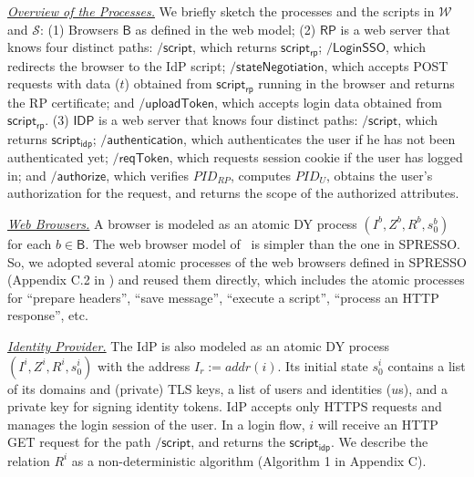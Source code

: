 \vspace{1mm}\noindent \underline{\em Overview of the Processes.} We briefly sketch the processes and the scripts in $\mathcal{W}$ and $\mathcal{S}$: 
(1) Browsers $\mathsf{B}$ as defined in the web model; 
(2) $\mathsf{RP}$ is a web server that knows four distinct paths: $\mathsf{/script}$, which returns $\mathsf{script_{rp}}$; $\mathsf{/LoginSSO}$, which redirects the browser to the IdP script; $\mathsf{/stateNegotiation}$, which accepts POST requests with data ($t$) obtained from $\mathsf{script_{rp}}$ running in the browser and returns the RP certificate; and $\mathsf{/uploadToken}$, which accepts login data obtained from $\mathsf{script_{rp}}$. 
(3) $\mathsf{IDP}$ is a web server that knows four distinct paths: $\mathsf{/script}$, which returns $\mathsf{script_{idp}}$; $\mathsf{/authentication}$, which authenticates the user if he has not been authenticated yet; $\mathsf{/reqToken}$, which requests session cookie if the user has logged in; and $\mathsf{/authorize}$, which verifies $PID_{RP}$, computes $PID_U$, obtains the user's authorization for the request, and returns the scope of the authorized attributes. %

\vspace{1mm}\noindent \underline{\em Web Browsers.} A browser is modeled as an atomic DY process $(I^b, Z^b, R^b, s_0^b)$ for each $b \in \mathsf{B}$. The web browser model of \usso\ is simpler than the one in SPRESSO. So, we adopted several atomic processes of the web browsers defined in SPRESSO (Appendix C.2 in \cite{SPRESSO}) and reused them directly, which includes the atomic processes for ``prepare headers'', ``save message'', ``execute a script'', ``process an HTTP response'', etc. 

\vspace{1mm}\noindent \underline{\em Identity Provider.} The IdP is also modeled as an atomic DY process $(I^i, Z^i, R^i, s_0^i)$ with the address $I_r:=addr(i)$. Its initial state $s_0^i$ contains a list of its domains and (private) TLS keys, a list of users and identities ($u$s), and a private key
for signing identity tokens. IdP accepts only HTTPS requests and manages the login session of the user. In a login flow, $i$ will receive an HTTP GET request for the path $\mathsf{/script}$, and returns the $\mathsf{script_{idp}}$. We describe the relation $R^i$ as a non-deterministic algorithm (Algorithm 1 in Appendix C). 


